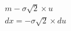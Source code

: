 \documentclass[preview]{standalone}
\begin{document}
\begin{align*}
m - \sigma \sqrt{2} \times u\\dx = - \sigma \sqrt{2} \times du\\ \\ \\
\end{align*}
\end{document}
